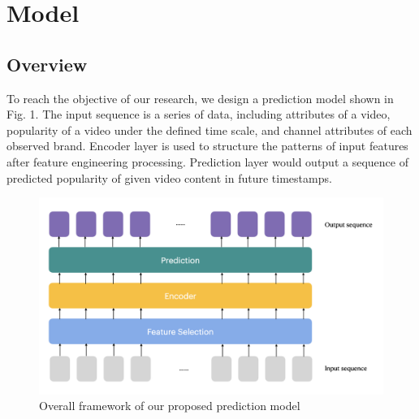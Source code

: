 \section{Model}

\subsection{Overview}

To reach the objective of our research, we design a prediction model shown in Fig. 1. The input sequence is a series of data, including attributes of a video, popularity of a video under the defined time scale, and channel attributes of each observed brand. Encoder layer is used to structure the patterns of input features after feature engineering processing. Prediction layer would output a sequence of predicted popularity of given video content in future timestamps.

\begin{figure}[h]
\includegraphics[scale=0.3]{figures/Proposed Model.png}
\caption{Overall framework of our proposed prediction model}
\end{figure}
